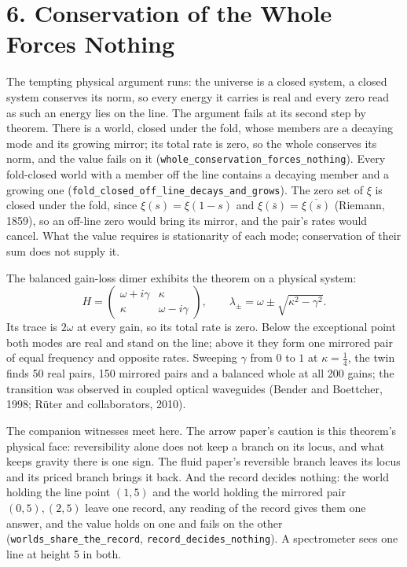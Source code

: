 \documentclass[10pt]{article}
\begin{document}
\hypertarget{conservation-of-the-whole-forces-nothing}{%
\section{6. Conservation of the Whole Forces
Nothing}\label{conservation-of-the-whole-forces-nothing}}

The tempting physical argument runs: the universe is a closed system, a
closed system conserves its norm, so every energy it carries is real and
every zero read as such an energy lies on the line. The argument fails
at its second step by theorem. There is a world, closed under the fold,
whose members are a decaying mode and its growing mirror; its total rate
is zero, so the whole conserves its norm, and the value fails on it
(\texttt{whole\_conservation\_forces\_nothing}). Every fold-closed world
with a member off the line contains a decaying member and a growing one
(\texttt{fold\_closed\_off\_line\_decays\_and\_grows}). The zero set of
\(\xi\) is closed under the fold, since \(\xi(s)=\xi(1-s)\) and
\(\xi(\bar s)=\overline{\xi(s)}\) (Riemann, 1859), so an off-line zero
would bring its mirror, and the pair's rates would cancel. What the
value requires is stationarity of each mode; conservation of their sum
does not supply it.

The balanced gain-loss dimer exhibits the theorem on a physical system:
\[H=\begin{pmatrix}\omega+i\gamma & \kappa\\ \kappa & \omega-i\gamma\end{pmatrix},\qquad \lambda_\pm=\omega\pm\sqrt{\kappa^{2}-\gamma^{2}}.\]
Its trace is \(2\omega\) at every gain, so its total rate is zero. Below
the exceptional point both modes are real and stand on the line; above
it they form one mirrored pair of equal frequency and opposite rates.
Sweeping \(\gamma\) from \(0\) to \(1\) at \(\kappa=\tfrac14\), the twin
finds 50 real pairs, 150 mirrored pairs and a balanced whole at all 200
gains; the transition was observed in coupled optical waveguides (Bender
and Boettcher, 1998; Rüter and collaborators, 2010).

The companion witnesses meet here. The arrow paper's caution is this
theorem's physical face: reversibility alone does not keep a branch on
its locus, and what keeps gravity there is one sign. The fluid paper's
reversible branch leaves its locus and its priced branch brings it back.
And the record decides nothing: the world holding the line point
\((1,5)\) and the world holding the mirrored pair \((0,5),(2,5)\) leave
one record, any reading of the record gives them one answer, and the
value holds on one and fails on the other
(\texttt{worlds\_share\_the\_record},
\texttt{record\_decides\_nothing}). A spectrometer sees one line at
height 5 in both.
\end{document}
